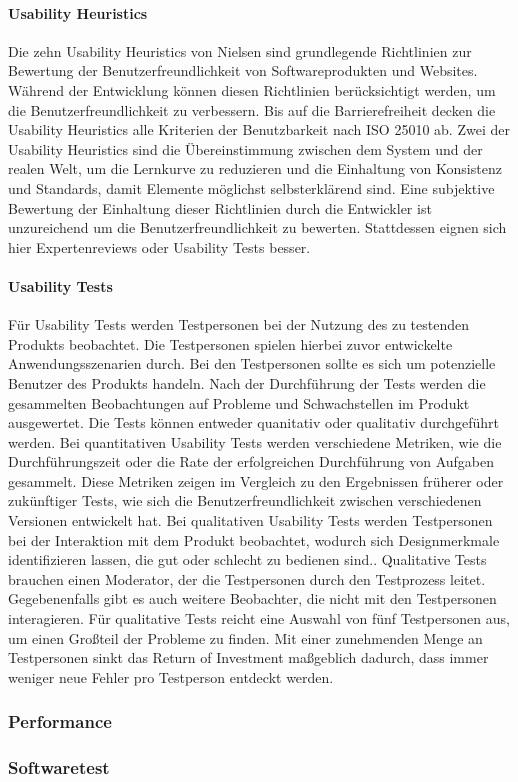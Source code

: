 \paragraph{Usability Heuristics}
Die zehn Usability Heuristics von Nielsen sind grundlegende Richtlinien zur Bewertung der Benutzerfreundlichkeit von Softwareprodukten und Websites. Während der Entwicklung können diesen Richtlinien berücksichtigt werden, um die Benutzerfreundlichkeit zu verbessern. Bis auf die Barrierefreiheit decken die Usability Heuristics alle Kriterien der Benutzbarkeit nach ISO 25010 ab. Zwei der Usability Heuristics sind die Übereinstimmung zwischen dem System und der realen Welt, um die Lernkurve zu reduzieren und die Einhaltung von Konsistenz und Standards, damit Elemente möglichst selbsterklärend sind.\cite{Nielsen.1994} Eine subjektive Bewertung der Einhaltung dieser Richtlinien durch die Entwickler ist unzureichend um die Benutzerfreundlichkeit zu bewerten. Stattdessen eignen sich hier Expertenreviews oder Usability Tests besser.

\paragraph{Usability Tests}
Für Usability Tests werden Testpersonen bei der Nutzung des zu testenden Produkts beobachtet. Die Testpersonen spielen hierbei zuvor entwickelte Anwendungsszenarien durch. Bei den Testpersonen sollte es sich um potenzielle Benutzer des Produkts handeln.\cite[S.~22]{Dumas.1999} Nach der Durchführung der Tests werden die gesammelten Beobachtungen auf Probleme und Schwachstellen im Produkt ausgewertet. Die Tests können entweder quanitativ oder qualitativ durchgeführt werden. Bei quantitativen Usability Tests werden verschiedene Metriken, wie die Durchführungszeit oder die Rate der erfolgreichen Durchführung von Aufgaben gesammelt. Diese Metriken zeigen im Vergleich zu den Ergebnissen früherer oder zukünftiger Tests, wie sich die Benutzerfreundlichkeit zwischen verschiedenen Versionen entwickelt hat. Bei qualitativen Usability Tests werden Testpersonen bei der Interaktion mit dem Produkt beobachtet, wodurch sich Designmerkmale identifizieren lassen, die gut oder schlecht zu bedienen sind.\cite{Budiu.2017}. Qualitative Tests brauchen einen Moderator, der die Testpersonen durch den Testprozess leitet. Gegebenenfalls gibt es auch weitere Beobachter, die nicht mit den Testpersonen interagieren.\cite{Moran.2019} Für qualitative Tests reicht eine Auswahl von fünf Testpersonen aus, um einen Großteil der Probleme zu finden. Mit einer zunehmenden Menge an Testpersonen sinkt das Return of Investment maßgeblich dadurch, dass immer weniger neue Fehler pro Testperson entdeckt werden.\cite{Nielsen.2012}

\subsubsection{Performance}

\subsubsection{Softwaretest}